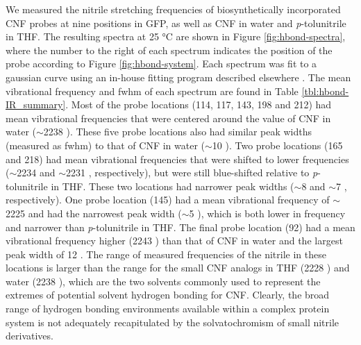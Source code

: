 We measured the nitrile stretching frequencies of biosynthetically incorporated CNF probes at nine positions in GFP, as well as CNF in water and \emph{p}-tolunitrile in THF.
The resulting spectra at 25 \si{\celsius} are shown in Figure \ref{fig:hbond-spectra}, where the number to the right of each spectrum indicates the position of the probe according to Figure \ref{fig:hbond-system}.
Each spectrum was fit to a gaussian curve using an in-house fitting program described elsewhere \cite{Ragain2012}.
The mean vibrational frequency and fwhm of each spectrum are found in Table \ref{tbl:hbond-IR_summary}.
Most of the probe locations (114, 117, 143, 198 and 212) had mean vibrational frequencies that were centered around the value of CNF in water ($\sim$2238 \si{\wn}).
These five probe locations also had similar peak widths (measured as fwhm) to that of CNF in water ($\sim$10 \si{\wn}).
Two probe locations (165 and 218) had mean vibrational frequencies that were shifted to lower frequencies ($\sim$2234 \si{\wn} and $\sim$2231 \si{\wn}, respectively), but were still blue-shifted relative to \emph{p}-tolunitrile in THF.
These two locations had narrower peak widths ($\sim$8 \si{\wn} and $\sim$7 \si{\wn}, respectively).
One probe location (145) had a mean vibrational frequency of $\sim$2225 \si{\wn} and had the narrowest peak width ($\sim$5 \si{\wn}), which is both lower in frequency and narrower than \emph{p}-tolunitrile in THF.
The final probe location (92) had a mean vibrational frequency higher (2243 \si{\wn}) than that of CNF in water and the largest peak width of 12 \si{\wn}.
The range of measured frequencies of the nitrile in these locations is larger than the range for the small CNF analogs in THF (2228 \si{\wn}) and water (2238 \si{\wn}), which are the two solvents commonly used to represent the extremes of potential solvent hydrogen bonding for CNF.
Clearly, the broad range of hydrogen bonding environments available within a complex protein system is not adequately recapitulated by the solvatochromism of small nitrile derivatives. 

